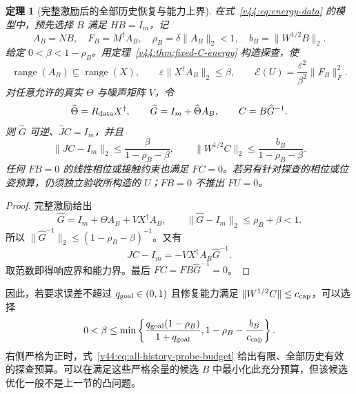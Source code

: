 \documentclass[11pt,a4paper]{article}
\numberwithin{equation}{section}
\newtheorem{theorem}{定理}[section]
\theoremstyle{definition}
\begin{document}
\begin{theorem}[完整激励后的全部历史恢复与能力上界]
\label{v44:thm:all-history-energy-upper}
在式~\eqref{v44:eq:energy-data} 的模型中，预先选择 $B$ 满足 $HB=I_m$，记
\begin{equation}
 A_B=NB,\quad F_B=M^\dagger A_B,\quad
 \rho_B=\delta\|A_B\|_2<1,\quad
 b_B=\|W^{1/2}B\|_2.
\end{equation}
给定 $0<\beta<1-\rho_B$。用定理~\ref{v44:thm:fixed-C-energy} 构造探查，使
\begin{equation}
 \operatorname{range}(A_B)\subseteq\operatorname{range}(X),
 \qquad\varepsilon\|X^\dagger A_B\|_2\le\beta,
 \qquad\mathcal E(U)=\frac{\varepsilon^2}{\beta^2}\|F_B\|_F^2.
 \label{v44:eq:all-history-probe-budget}
\end{equation}
对任意允许的真实 $\Theta$ 与噪声矩阵 $V$，令
\begin{equation}
 \widehat\Theta=R_{\rm data}X^\dagger,\qquad
 \widehat G=I_m+\widehat\Theta A_B,
 \qquad C=B\widehat G^{-1}.
 \label{v44:eq:all-history-repair}
\end{equation}
则 $\widehat G$ 可逆、$\widehat JC=I_m$，并且
\begin{equation}
 \boxed{
 \|JC-I_m\|_2
 \le\frac{\beta}{1-\rho_B-\beta},\qquad
 \|W^{1/2}C\|_2
 \le\frac{b_B}{1-\rho_B-\beta}.}
 \label{v44:eq:all-history-q-cap}
\end{equation}
任何 $FB=0$ 的线性相位或接触约束也满足 $FC=0$。若另有针对探查的相位或位姿预算，仍须独立验收所构造的 $U$；$FB=0$ 不推出 $FU=0$。
\end{theorem}

\begin{proof}
完整激励给出
\begin{equation}
 \widehat G=I_m+\Theta A_B+VX^\dagger A_B,
 \qquad \|\widehat G-I_m\|_2\le\rho_B+\beta<1.
\end{equation}
所以 $\|\widehat G^{-1}\|_2\le(1-\rho_B-\beta)^{-1}$。又有
\begin{equation}
 JC-I_m=-VX^\dagger A_B\widehat G^{-1}.
\end{equation}
取范数即得响应界和能力界。最后 $FC=FB\widehat G^{-1}=0$。
\end{proof}

因此，若要求误差不超过 $q_{\rm goal}\in(0,1)$ 且修复能力满足 $\|W^{1/2}C\|\le c_{\rm cap}$，可以选择
\begin{equation}
 0<\beta\le
 \min\left\{
 \frac{q_{\rm goal}(1-\rho_B)}{1+q_{\rm goal}},
 1-\rho_B-\frac{b_B}{c_{\rm cap}}
 \right\}.
 \label{v44:eq:all-history-feasible-beta}
\end{equation}
右侧严格为正时，式~\eqref{v44:eq:all-history-probe-budget} 给出有限、全部历史有效的探查预算。可以在满足这些严格余量的候选 $B$ 中最小化此充分预算，但该候选优化一般不是上一节的凸问题。
\end{document}
